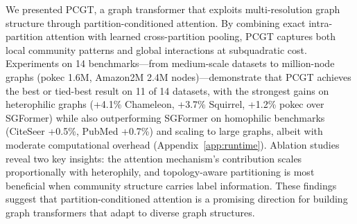 \documentclass[twocolumn, 10pt]{article}
\begin{document}
We presented PCGT, a graph transformer that exploits multi-resolution graph structure through partition-conditioned attention. By combining exact intra-partition attention with learned cross-partition pooling, PCGT captures both local community patterns and global interactions at subquadratic cost. Experiments on 14 benchmarks---from medium-scale datasets to million-node graphs (pokec 1.6M, Amazon2M 2.4M nodes)---demonstrate that PCGT achieves the best or tied-best result on 11 of 14 datasets, with the strongest gains on heterophilic graphs (+4.1\% Chameleon, +3.7\% Squirrel, +1.2\% pokec over SGFormer) while also outperforming SGFormer on homophilic benchmarks (CiteSeer +0.5\%, PubMed +0.7\%) and scaling to large graphs, albeit with moderate computational overhead (Appendix~\ref{app:runtime}). Ablation studies reveal two key insights: the attention mechanism's contribution scales proportionally with heterophily, and topology-aware partitioning is most beneficial when community structure carries label information. These findings suggest that partition-conditioned attention is a promising direction for building graph transformers that adapt to diverse graph structures.

{\small


}


\end{document}
